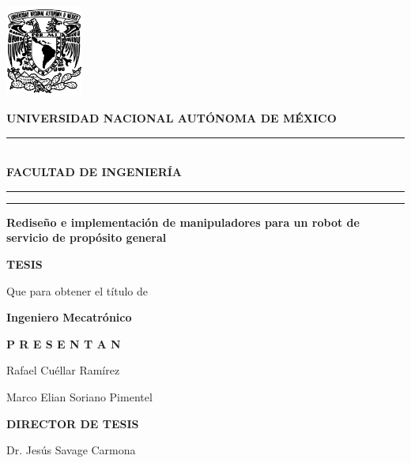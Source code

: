 \documentclass[12pt,twoside]{report}
\begin{document}
\thispagestyle{empty}

\begin{minipage}[t]{20cm}
  \includegraphics[height=3.0cm]{images/escudounam_negro.jpg}
  \hspace{0.5cm}
  \begin{minipage}[b]{14cm}
    \centering
    {\large \textbf{UNIVERSIDAD NACIONAL AUTÓNOMA DE MÉXICO}}\\[6pt]
    \rule{0.9\linewidth}{2pt}\\[6pt]
    {\large\textbf{FACULTAD DE INGENIERÍA}}
  \end{minipage}
\end{minipage}

\begin{minipage}[t]{20cm}
  \vspace{1mm}
  \hspace{0.5cm} %
  \rule{3pt}{450pt}\hspace{15pt}\rule{3pt}{450pt}
  \hspace{1cm} %
  \begin{minipage}[b]{15cm}
    \centering
    \Large\textbf{Rediseño e implementación de manipuladores para un robot de servicio de propósito general}
    \vspace{3cm}

    \Large\textbf{TESIS}
    
    \large Que para obtener el título de
    
    \Large\textbf{Ingeniero Mecatrónico}
    \vspace{2cm}
    
    \Large\textbf{P R E S E N T A N}
    
    \Large Rafael Cuéllar Ramírez
    
    \Large Marco Elian Soriano Pimentel
    \vspace{2cm}
    
    \Large\textbf{DIRECTOR DE TESIS}
    
    \Large Dr. Jesús Savage Carmona
  \end{minipage}
\end{minipage}
\end{document}
